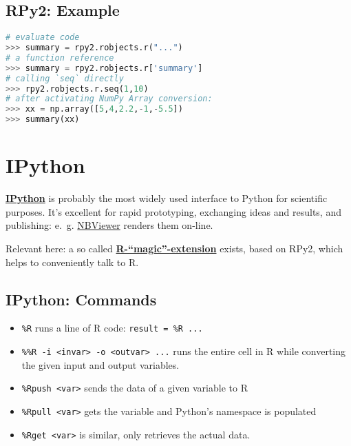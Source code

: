 \documentclass[
paper=128mm:96mm, %
fontsize=11pt, %
pagesize, %
parskip=half-, %
]{scrartcl} %
\theoremstyle{mythmstyle} %
\def\shorttitle{R meets Python}
\newcommand*{\runninghead}{\shorttitle} %
\newcommand*{\newhead}[1]{\renewcommand*{\runninghead}{\shorttitle: #1}}
\begin{document}
\clearpage
\newhead{RPy2: Example}
\subsection{RPy2: Example}

\begin{lstlisting}[language=Python]
# evaluate code
>>> summary = rpy2.robjects.r("...")
# a function reference
>>> summary = rpy2.robjects.r['summary']
# calling `seq` directly
>>> rpy2.robjects.r.seq(1,10)
# after activating NumPy Array conversion:
>>> xx = np.array([5,4,2.2,-1,-5.5])
>>> summary(xx)
\end{lstlisting}


\clearpage
\newhead{IPython}
\section{IPython}

\href{http://www.ipython.org}{\textbf{IPython}} is probably the most
widely used interface to Python for scientific purposes.
It's excellent for rapid prototyping, exchanging ideas and results,
and publishing: e.~g. \href{http://nbviewer.ipython.org/}{NBViewer} renders them on-line.

Relevant here: a so called
\href{http://ipython.org/ipython-doc/dev/config/extensions/rmagic.html}
{\textbf{R-``magic''-extension}} exists,
based on RPy2, which helps to conveniently talk to R.

\clearpage
\newhead{IPython: Commands}
\subsection{IPython: Commands}

\begin{itemize}
\item{\texttt{\%R}} runs a line of R code: \texttt{result = \%R ...}
\item{\texttt{\%\%R -i <invar> -o <outvar> ...}}
runs the entire cell in R while converting the given input and output variables.
\item{\texttt{\%Rpush <var>}} sends the data of a given variable to R
\item{\texttt{\%Rpull <var>}} gets the variable and Python's namespace is populated
\item{\texttt{\%Rget <var>}} is similar, only retrieves the actual data.
\end{itemize}

\clearpage
\newhead{IPython: Example}
\end{document}

